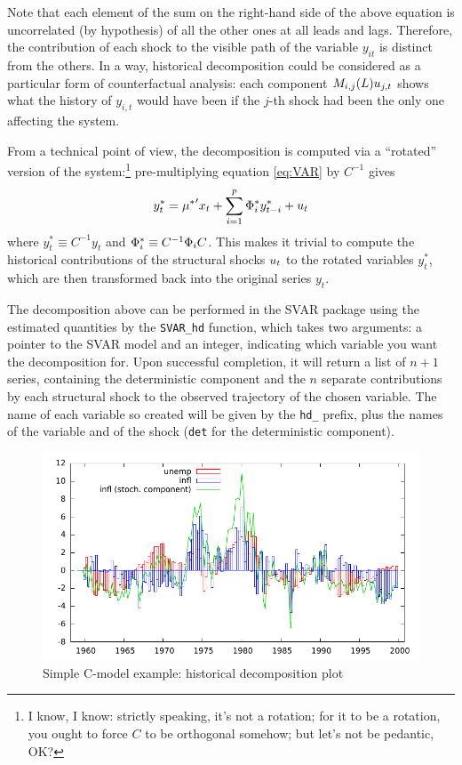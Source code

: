 \documentclass[a4paper,10pt]{article}
\newcommand{\cmd}[1]{\texttt{#1}}
\newcommand{\StS}[1]{\ensuremath u_{#1}}
\newcommand{\VarSym}{\ensuremath \Phi}
\begin{document}
Note that each element of the sum on the right-hand side of the above
equation is uncorrelated (by hypothesis) of all the other ones at all
leads and lags. Therefore, the contribution of each shock to the
visible path of the variable $y_{it}$ is distinct from the others. In
a way, historical decomposition could be considered as a particular
form of counterfactual analysis: each component $M_{i,j}(L) \StS{j,t}$
shows what the history of $y_{i,t}$ would have been if the $j$-th
shock had been the only one affecting the system.

From a technical point of view, the decomposition is computed via a
``rotated'' version of the system:\footnote{I know, I know: strictly
  speaking, it's not a rotation; for it to be a rotation, you ought to
  force $C$ to be orthogonal somehow; but let's not be pedantic, OK?}
pre-multiplying equation \eqref{eq:VAR} by $C^{-1}$ gives
\[
  y^*_t = {\mu^*}' x_t +  \sum_{i=1}^p \VarSym^*_i y^*_{t-i} + \StS{t}
\]
where $y^*_t \equiv C^{-1} y_t$ and $\VarSym^*_i \equiv C^{-1}
\VarSym_i C$. This makes it trivial to compute the historical
contributions of the structural shocks $\StS{t}$ to the rotated
variables $y^*_t$, which are then transformed back into the original
series $y_t$.

The decomposition above can be performed in the SVAR package using the
estimated quantities by the \cmd{SVAR\_hd} function, which takes two
arguments: a pointer to the SVAR model and an integer, indicating
which variable you want the decomposition for. Upon successful
completion, it will return a list of $n+1$ series, containing the
deterministic component and the $n$ separate contributions by each
structural shock to the observed trajectory of the chosen
variable. The name of each variable so created will be given by the
\verb|hd_| prefix, plus the names of the variable and of the shock
(\verb|det| for the deterministic component).

\begin{figure}[htbp]
  \centering
  \includegraphics[scale=0.8]{Cmodel_hd}
  \caption{Simple C-model example: historical decomposition plot}
  \label{fig:Cmodel-hd}
\end{figure}
\end{document}
